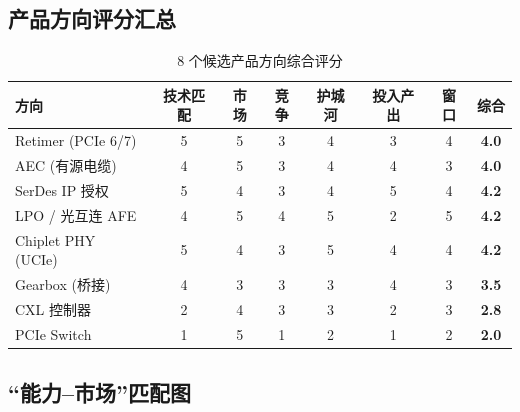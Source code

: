 \documentclass[11pt,a4paper]{ctexart}
\begin{document}
\subsection{产品方向评分汇总}

\begin{table}[htb]
    \centering
    \caption{8 个候选产品方向综合评分}
    \label{tab:summary}
    \begin{tabular}{lccccccc}
        \toprule
        \textbf{方向} & \textbf{技术匹配} & \textbf{市场} & \textbf{竞争} & \textbf{护城河} & \textbf{投入产出} & \textbf{窗口} & \textbf{综合} \\
        \midrule
        Retimer (PCIe 6/7) & 5 & 5 & 3 & 4 & 3 & 4 & \textbf{4.0} \\
        AEC (有源电缆)   & 4 & 5 & 3 & 4 & 4 & 3 & \textbf{4.0} \\
        SerDes IP 授权    & 5 & 4 & 3 & 4 & 5 & 4 & \textbf{4.2} \\
        LPO / 光互连 AFE  & 4 & 5 & 4 & 5 & 2 & 5 & \textbf{4.2} \\
        Chiplet PHY (UCIe) & 5 & 4 & 3 & 5 & 4 & 4 & \textbf{4.2} \\
        \midrule
        Gearbox (桥接)    & 4 & 3 & 3 & 3 & 4 & 3 & \textbf{3.5} \\
        CXL 控制器        & 2 & 4 & 3 & 3 & 2 & 3 & \textbf{2.8} \\
        PCIe Switch       & 1 & 5 & 1 & 2 & 1 & 2 & \textbf{2.0} \\
        \bottomrule
    \end{tabular}
\end{table}

\subsection{``能力--市场''匹配图}
\end{document}
